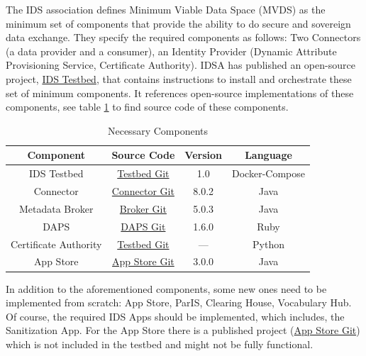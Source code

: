 \documentclass{article}
\begin{document}
The IDS association defines Minimum Viable Data Space (MVDS) as the minimum set of components that provide the ability to do secure and sovereign data exchange. They specify the required components as follows: Two Connectors (a data provider and a consumer), an Identity Provider (Dynamic Attribute Provisioning Service, Certificate Authority). IDSA has published an open-source project, \href{https://github.com/International-Data-Spaces-Association/IDS-testbed}{IDS Testbed}, that contains instructions to install and orchestrate these set of minimum components. It references open-source implementations of these components, see table \ref{tab:components} to find source code of these components.

\begin{table}[h]
    \label{tab:components}
    \centering
    \begin{tabular}{|c|c|c|c|}
    \hline
    \textbf{Component} & \textbf{Source Code} & \textbf{Version} & \textbf{Language} \\
    \hline
    IDS Testbed & \href{https://github.com/International-Data-Spaces-Association/IDS-testbed}{Testbed Git} & 1.0 & Docker-Compose \\
    \hline
    Connector & \href{https://github.com/International-Data-Spaces-Association/DataspaceConnector/tree/v8.0.2}{Connector Git} & 8.0.2 & Java \\
    \hline
    Metadata Broker & \href{https://github.com/International-Data-Spaces-Association/metadata-broker-open-core}{Broker Git} & 5.0.3 & Java \\
    \hline
    DAPS & \href{https://github.com/International-Data-Spaces-Association/omejdn-daps}{DAPS Git} & 1.6.0 & Ruby \\
    \hline
    Certificate Authority & \href{https://github.com/International-Data-Spaces-Association/IDS-testbed/tree/master/CertificateAuthority}{Testbed Git} & --- & Python \\
    \hline
    App Store & \href{https://github.com/International-Data-Spaces-Association/IDS-AppStore}{App Store Git} & 3.0.0 & Java \\
    \hline
    \end{tabular}
    \caption{Necessary Components}
\end{table}

In addition to the aforementioned components, some new ones need to be implemented from scratch: App Store, ParIS, Clearing House, Vocabulary Hub. Of course, the required IDS Apps should be implemented, which includes, the Sanitization App. 
For the App Store there is a published project (\href{https://github.com/International-Data-Spaces-Association/IDS-AppStore}{App Store Git}) which is not included in the testbed and might not be fully functional.
\end{document}
